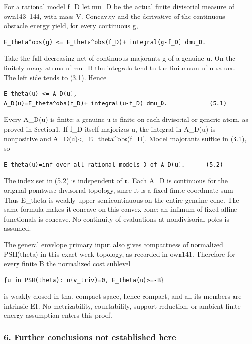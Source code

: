 \documentclass[
  10pt,
]{article}
\begin{document}
For a rational model f\_D let mu\_D be the actual finite divisorial
measure of own143--144, with mass V. Concavity and the derivative of the
continuous obstacle energy yield, for every continuous g,

\begin{verbatim}
E_theta^obs(g) <= E_theta^obs(f_D)+ integral(g-f_D) dmu_D.
\end{verbatim}

Take the full decreasing net of continuous majorants g of a genuine u.
On the finitely many atoms of mu\_D the integrals tend to the finite sum
of u values. The left side tends to (3.1). Hence

\begin{verbatim}
E_theta(u) <= A_D(u),
A_D(u)=E_theta^obs(f_D)+ integral(u-f_D) dmu_D.            (5.1)
\end{verbatim}

Every A\_D(u) is finite: a genuine u is finite on each divisorial or
generic atom, as proved in Section1. If f\_D itself majorizes u, the
integral in A\_D(u) is nonpositive and
A\_D(u)\textless=E\_theta\^{}obs(f\_D). Model majorants suffice in
(3.1), so

\begin{verbatim}
E_theta(u)=inf over all rational models D of A_D(u).      (5.2)
\end{verbatim}

The index set in (5.2) is independent of u. Each A\_D is continuous for
the original pointwise-divisorial topology, since it is a fixed finite
coordinate sum. Thus E\_theta is weakly upper semicontinuous on the
entire genuine cone. The same formula makes it concave on this convex
cone: an infimum of fixed affine functionals is concave. No continuity
of evaluations at nondivisorial poles is assumed.

The general envelope primary input also gives compactness of normalized
PSH(theta) in this exact weak topology, as recorded in own141. Therefore
for every finite B the normalized cost sublevel

\begin{verbatim}
{u in PSH(theta): u(v_triv)=0, E_theta(u)>=-B}
\end{verbatim}

is weakly closed in that compact space, hence compact, and all its
members are intrinsic E1. No metrizability, countability, support
reduction, or ambient finite-energy assumption enters this proof.

\subsubsection{6. Further conclusions not established
here}\label{further-conclusions-not-established-here}
\end{document}
